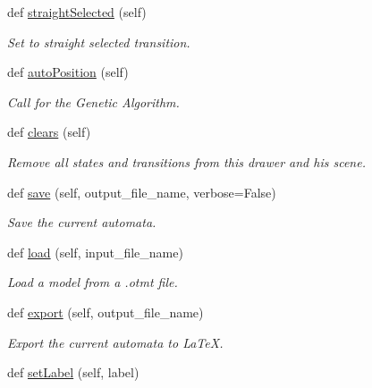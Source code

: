 \begin{DoxyCompactItemize}
def \mbox{\hyperlink{classDrawer_1_1Drawer_ad41b61b6b2e32945584b155d4de7d571}{straight\+Selected}} (self)
\begin{DoxyCompactList}\small\item\em Set to straight selected transition. \end{DoxyCompactList}\item 
\mbox{\label{classDrawer_1_1Drawer_a87d94e386bcf89fe98a65b3859126aa8}} 
def \mbox{\hyperlink{classDrawer_1_1Drawer_a87d94e386bcf89fe98a65b3859126aa8}{auto\+Position}} (self)
\begin{DoxyCompactList}\small\item\em Call for the Genetic Algorithm. \end{DoxyCompactList}\item 
def \mbox{\hyperlink{classDrawer_1_1Drawer_ac487d0cbf8b206c1a4405a2e1da26526}{clears}} (self)
\begin{DoxyCompactList}\small\item\em Remove all states and transitions from this drawer and his scene. \end{DoxyCompactList}\item 
def \mbox{\hyperlink{classDrawer_1_1Drawer_ad2f169528e41121dbe082bc62148bbd4}{save}} (self, output\+\_\+file\+\_\+name, verbose=False)
\begin{DoxyCompactList}\small\item\em Save the current automata. \end{DoxyCompactList}\item 
def \mbox{\hyperlink{classDrawer_1_1Drawer_ab0563a671a284efd8f55bb70a883fd4c}{load}} (self, input\+\_\+file\+\_\+name)
\begin{DoxyCompactList}\small\item\em Load a model from a .otmt file. \end{DoxyCompactList}\item 
\mbox{\label{classDrawer_1_1Drawer_a5696840acedb9b49be0d29a825c390ac}} 
def \mbox{\hyperlink{classDrawer_1_1Drawer_a5696840acedb9b49be0d29a825c390ac}{export}} (self, output\+\_\+file\+\_\+name)
\begin{DoxyCompactList}\small\item\em Export the current automata to La\+TeX. \end{DoxyCompactList}\item 
def \mbox{\hyperlink{classDrawer_1_1Drawer_aec0fcb955a455d1275923b0d9ffb99ec}{set\+Label}} (self, label)

\end{DoxyCompactItemize}
